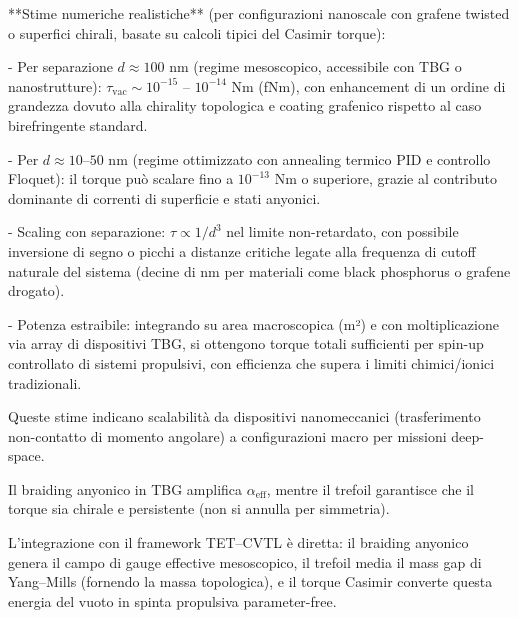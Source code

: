\documentclass[11pt,a4paper]{article}
\theoremstyle{plain}
\theoremstyle{definition}
\begin{document}
\vspace{0.5cm}

**Stime numeriche realistiche** (per configurazioni nanoscale con grafene twisted o superfici chirali, basate su calcoli tipici del Casimir torque):


\vspace{0.2cm}

- Per separazione \(d \approx 100\) nm (regime mesoscopico, accessibile con TBG o nanostrutture): \(\tau_{\text{vac}} \sim 10^{-15}\) – \(10^{-14}\) Nm (fNm), con enhancement di un ordine di grandezza dovuto alla chirality topologica e coating grafenico rispetto al caso birefringente standard.


\vspace{0.2cm}
- Per \(d \approx 10\)–\(50\) nm (regime ottimizzato con annealing termico PID e controllo Floquet): il torque può scalare fino a \(10^{-13}\) Nm o superiore, grazie al contributo dominante di correnti di superficie e stati anyonici.

\vspace{0.2cm}
- Scaling con separazione: \(\tau \propto 1/d^3\) nel limite non-retardato, con possibile inversione di segno o picchi a distanze critiche legate alla frequenza di cutoff naturale del sistema (decine di nm per materiali come black phosphorus o grafene drogato).

\vspace{0.2cm}
- Potenza estraibile: integrando su area macroscopica (m²) e con moltiplicazione via array di dispositivi TBG, si ottengono torque totali sufficienti per spin-up controllato di sistemi propulsivi, con efficienza che supera i limiti chimici/ionici tradizionali.

\vspace{0.3cm}

Queste stime indicano scalabilità da dispositivi nanomeccanici (trasferimento non-contatto di momento angolare) a configurazioni macro per missioni deep-space. 

\vspace{0.2cm}


Il braiding anyonico in TBG amplifica \(\alpha_{\text{eff}}\), mentre il trefoil garantisce che il torque sia chirale e persistente (non si annulla per simmetria).

\vspace{0.3cm}

L'integrazione con il framework TET--CVTL è diretta: il braiding anyonico genera il campo di gauge effective mesoscopico, il trefoil media il mass gap di Yang--Mills (fornendo la massa topologica), e il torque Casimir converte questa energia del vuoto in spinta propulsiva parameter-free.
\end{document}
